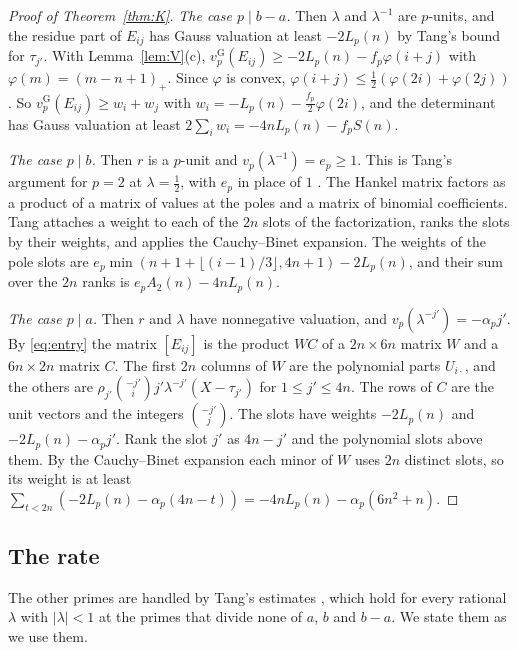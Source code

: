 \documentclass[11pt]{amsart}
\theoremstyle{definition}
\theoremstyle{remark}
\numberwithin{equation}{section}
\newcommand{\vG}{v_p^{\mathrm G}}
\begin{document}
\begin{proof}[Proof of Theorem~\ref{thm:K}]
\emph{The case $p\mid b-a$.} Then $\lambda$ and $\lambda^{-1}$ are $p$-units, and the residue part of $E_{ij}$ has Gauss
valuation at least $-2L_p(n)$ by Tang's bound for $\tau_{j'}$. With Lemma~\ref{lem:V}(c),
$\vG(E_{ij})\ge-2L_p(n)-f_p\varphi(i+j)$ with $\varphi(m)=(m-n+1)_+$. Since $\varphi$ is convex,
$\varphi(i+j)\le\frac12(\varphi(2i)+\varphi(2j))$. So $\vG(E_{ij})\ge w_i+w_j$ with $w_i=-L_p(n)-\frac{f_p}2\varphi(2i)$,
and the determinant has Gauss valuation at least $2\sum_iw_i=-4nL_p(n)-f_pS(n)$.

\emph{The case $p\mid b$.} Then $r$ is a $p$-unit and $v_p(\lambda^{-1})=e_p\ge1$. This is Tang's argument for $p=2$ at
$\lambda=\frac12$, with $e_p$ in place of $1$ \cite{TangLi2}. The Hankel matrix factors as a product of a matrix of
values at the poles and a matrix of binomial coefficients. Tang attaches a weight to each of the $2n$ slots of the
factorization, ranks the slots by their weights, and applies the Cauchy--Binet expansion. The weights of the pole slots
are $e_p\min(n+1+\lfloor(i-1)/3\rfloor,4n+1)-2L_p(n)$, and their sum over the $2n$ ranks is $e_pA_2(n)-4nL_p(n)$.

\emph{The case $p\mid a$.} Then $r$ and $\lambda$ have nonnegative valuation, and $v_p(\lambda^{-j'})=-\alpha_pj'$. By
\eqref{eq:entry} the matrix $[E_{ij}]$ is the product $WC$ of a $2n\times6n$ matrix $W$ and a $6n\times2n$ matrix $C$.
The first $2n$ columns of $W$ are the polynomial parts $U_{i\cdot}$, and the others are
$\rho_{j'}\binom{-j'}ij'\lambda^{-j'}(X-\tau_{j'})$ for $1\le j'\le4n$. The rows of $C$ are the unit vectors and the
integers $\binom{-j'}j$. The slots have weights $-2L_p(n)$ and $-2L_p(n)-\alpha_pj'$. Rank the slot $j'$ as $4n-j'$ and
the polynomial slots above them. By the Cauchy--Binet expansion each minor of $W$ uses $2n$ distinct slots, so its
weight is at least $\sum_{t<2n}(-2L_p(n)-\alpha_p(4n-t))=-4nL_p(n)-\alpha_p(6n^2+n)$.
\end{proof}

\subsection{The rate}
The other primes are handled by Tang's estimates \cite{TangLi2}, which hold for every rational $\lambda$ with
$|\lambda|<1$ at the primes that divide none of $a$, $b$ and $b-a$. We state them as we use them.
\end{document}
